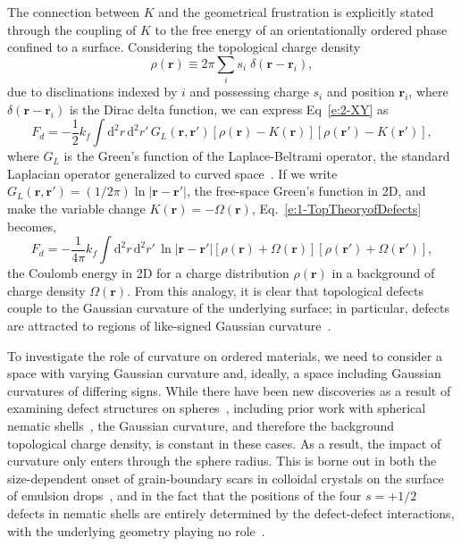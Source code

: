 The connection between $K$ and the geometrical frustration is explicitly stated through the coupling of $K$ to the free energy of an orientationally ordered phase confined to a surface.
Considering the topological charge density
\begin{equation}
  \rho(\mathbf{r}) \equiv 2 \pi \sum\limits_i s_{i} \; \delta(\mathbf{r} - \mathbf{r}_{i}),\label{e:1-ChargeDens}
\end{equation}
due to disclinations indexed by $i$ and possessing charge $s_{i}$ and position $\mathbf{r}_{i}$, where $\delta(\mathbf{r} - \mathbf{r}_{i})$ is the Dirac delta function, we can express Eq~\ref{e:2-XY} as~\cite{RN42,RN175,RN17}
\begin{equation}
  F_d = -\frac{1}{2} k_f \int \textrm{d}^2 r \, \textrm{d}^2 r' \, G_L(\mathbf{r},\mathbf{r}') [\rho(\mathbf{r})-K(\mathbf{r})] [\rho(\mathbf{r}')-K(\mathbf{r}')],\label{e:1-TopTheoryofDefects}
\end{equation}
where $G_L$ is the Green's function of the Laplace-Beltrami operator, the standard Laplacian operator generalized to curved space~\cite{RN17}.
If we write $G_L(\mathbf{r},\mathbf{r}') = (1/2\pi) \ln |\mathbf{r} - \mathbf{r}'|$, the free-space Green's function in 2D, and make the variable change $K(\mathbf{r}) = -\Omega(\mathbf{r})$, Eq.~\ref{e:1-TopTheoryofDefects} becomes,
\begin{equation}
  F_d = -\frac{1}{4 \pi} k_f \int \textrm{d}^2 r \, \textrm{d}^2 r' \, \ln |\mathbf{r} - \mathbf{r}'| [\rho(\mathbf{r})+\Omega(\mathbf{r})] [\rho(\mathbf{r}')+\Omega(\mathbf{r}')],
\end{equation}
the Coulomb energy in 2D for a charge distribution $\rho(\mathbf{r})$ in a background of charge density $\Omega(\mathbf{r})$.
From this analogy, it is clear that topological defects couple to the Gaussian curvature of the underlying surface; in particular, defects are attracted to regions of like-signed Gaussian curvature~\cite{RN17}.

To investigate the role of curvature on ordered materials, we need to consider a space with varying Gaussian curvature and, ideally, a space including Gaussian curvatures of differing signs.
While there have been new discoveries as a result of examining defect structures on spheres~\cite{RN106,RN26,RN110,RN76,RN101,RN165}, including prior work with spherical nematic shells~\cite{RN45,RN105}, the Gaussian curvature, and therefore the background topological charge density, is constant in these cases.
As a result, the impact of curvature only enters through the sphere radius.
This is borne out in both the size-dependent onset of grain-boundary scars in colloidal crystals on the surface of emulsion drops~\cite{RN26,RN110}, and in the fact that the positions of the four $s = +1/2$ defects in nematic shells are entirely determined by the defect-defect interactions, with the underlying geometry playing no role~\cite{RN45}.

